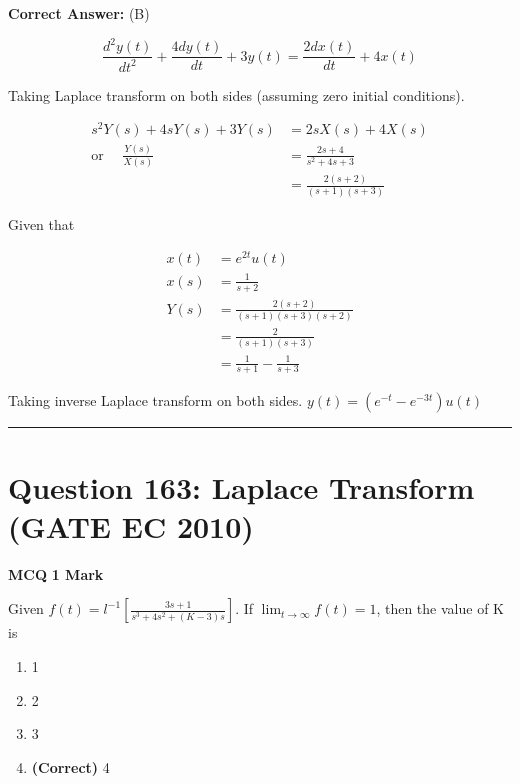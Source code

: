 \documentclass[11pt,a4paper]{article}
\begin{document}
\noindent \textbf{Correct Answer:} (B)

\begin{tcolorbox}[solbox, title=Detailed Solution -- Question 162]
\[
\frac{d^{2} y(t)}{d t^{2}}+\frac{4 d y(t)}{d t}+3 y(t)=\frac{2 d x(t)}{d t}+4 x(t)
\]

 Taking Laplace transform on both sides (assuming 
 zero initial conditions).

\[
\begin{aligned} s^{2} Y(s)+4 s Y(s)+3 Y(s)&=2 s X(s)+4 X(s) \\ \text{or }\quad \frac{Y(s)}{X(s)}&=\frac{2 s+4}{s^{2}+4 s+3} \\ &=\frac{2(s+2)}{(s+1)(s+3)} \end{aligned}
\]

 Given that

\[
\begin{aligned} x(t) &=e^{2 t} u(t) \\ x(s) &=\frac{1}{s+2} \\ Y(s) &=\frac{2(s+2)}{(s+1)(s+3)(s+2)} \\ &=\frac{2}{(s+1)(s+3)} \\ &=\frac{1}{s+1}-\frac{1}{s+3} \end{aligned}
\]

 Taking inverse Laplace transform on both sides.
$y(t)=(e^{-t}-e^{-3t})u(t)$
\end{tcolorbox}

\vspace{1.5em}
\hrule
\vspace{1.5em}

\section*{Question 163: Laplace Transform (GATE EC 2010)}
\noindent \textbf{\color{primary}MCQ} \hfill \textbf{\color{secondary}1 Mark}


\noindent Given $f(t)=l^{-1}[\frac{3s+1}{s^{3}+4s^{2}+(K-3)s}].$ If $\lim_{t\rightarrow \infty }f(t)=1$, then the value of K is


\begin{enumerate}[label=(\Alph*)]
    \item 1
    \item 2
    \item 3
    \item \textbf{(Correct)} 4
\end{enumerate}
\end{document}
